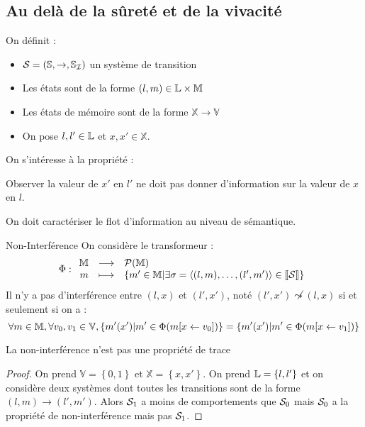 \documentclass{cours}
\begin{document}
\subsection{Au delà de la sûreté et de la vivacité}
On définit : 
\begin{itemize}
    \item $\mathcal{S} = \left(\mathbb{S}, \rightarrow, \mathbb{S}_{\mathcal{I}}\right)$ un système de transition
    \item Les états sont de la forme $\left(l, m\right) \in \mathbb{L} \times \mathbb{M}$
    \item Les états de mémoire sont de la forme $\mathbb{X} \rightarrow \mathbb{V}$
    \item On pose $l, l' \in \mathbb{L}$ et $x, x' \in \mathbb{X}$.
\end{itemize}
On s'intéresse à la propriété : 
\begin{center}
    Observer la valeur de $x'$ en $l'$ ne doit pas donner d'information sur la valeur de $x$ en $l$.
\end{center}
On doit caractériser le flot d'information au niveau de sémantique.
\begin{définition}{Non-Interférence}{}
    On considère le transformeur : 
    \[
        \Phi : \begin{array}{rcl}
            \mathbb{M} & \longrightarrow & \mathcal{P}(\mathbb{M})\\
            m & \longmapsto & \left\{m' \in \mathbb{M} \middle| \exists \sigma = \left\langle (l, m), \ldots, (l', m') \right\rangle \in \left\llbracket \mathcal{S} \right\rrbracket\right\}
        \end{array}
    \]
    Il n'y a pas d'interférence entre $(l, x)$ et $(l', x')$, noté $(l',x') \not\leadsto (l, x)$ si et seulement si on a : 
    \[
        \forall m \in \mathbb{M}, \forall v_{0}, v_{1} \in \mathbb{V}, \left\{m'(x')\middle| m' \in \Phi(m[x \gets v_{0}])\right\} = \left\{m'(x')\middle| m'\in \Phi(m[x \gets v_{1}])\right\}
    \]
\end{définition}
\begin{propositionfr}{}{}
    La non-interférence n'est pas une propriété de trace
\end{propositionfr}
\begin{proof}
    On prend $\mathbb{V} = \left\{0, 1\right\}$ et $\mathbb{X} = \left\{x, x'\right\}$. On prend $\mathbb{L} = \{l, l'\}$ et on considère deux systèmes dont toutes les transitions sont de la forme $(l,m) \to (l', m')$.  Alors $\mathcal{S}_{1}$ a moins de comportements que $\mathcal{S}_{0}$ mais $\mathcal{S}_{0}$ a la propriété de non-interférence mais pas $\mathcal{S}_{1}$.
\end{proof}
\end{document}
